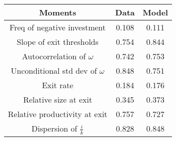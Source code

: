 \begin{table}[H] 
{\fontshape\scdefault\selectfont 
		\begin{center} 
			\begin{tabular}{ccc} 
				\hline\hline 
				Moments	& Data & Model \\ 
				\hline 
				Freq of negative investment & 0.108 &0.111\\ 
				Slope of exit thresholds & 0.754 &0.844\\ 
				Autocorrelation of $\omega$ & 0.742 &0.753\\ 
				Unconditional std dev of $\omega$ & 0.848 &0.751\\ 
				Exit rate & 0.184 &0.176\\ 
				Relative size at exit & 0.345 &0.373\\ 
				Relative productivity at exit & 0.757 &0.727\\ 
				Dispersion of $\frac{i}{k}$ & 0.828 &0.848\\ 
				\hline\hline 
			\end{tabular} 
	\end{center}} 
	\label{tab:moments-baseline} 
\end{table} 
